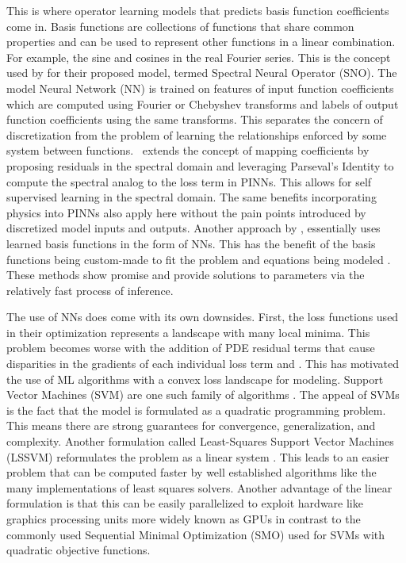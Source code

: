 \documentclass[preprint,12pt,times,authoryear]{elsarticle}
\begin{document}
This is where operator learning models that predicts basis function coefficients come in. Basis functions are collections of functions that share common properties and can be used to represent other functions in a linear combination. For example, the sine and cosines in the real Fourier series. This is the concept used by \citet{fanaskovSpectralNeuralOperators2023} for their proposed model, termed Spectral Neural Operator (SNO). The model Neural Network (NN) is trained on features of input function coefficients which are computed using Fourier or Chebyshev transforms and labels of output function coefficients using the same transforms. This separates the concern of discretization from the problem of learning the relationships enforced by some system between functions.\ \citet{du2024neural} extends the concept of mapping coefficients by proposing residuals in the spectral domain and leveraging Parseval's Identity to compute the spectral analog to the loss term in PINNs. This allows for self supervised learning in the spectral domain. The same benefits incorporating physics into PINNs also apply here without the pain points introduced by discretized model inputs and outputs. Another approach by \citet{luLearningNonlinearOperators2021}, essentially uses learned basis functions in the form of NNs. This has the benefit of the basis functions being custom-made to fit the problem and equations being modeled \citep{meurisMachinelearningbasedSpectralMethods2023}. These methods show promise and provide solutions to parameters via the relatively fast process of inference.

The use of NNs does come with its own downsides. First, the loss functions used in their optimization represents a landscape with many local minima. This problem becomes worse with the addition of PDE residual terms that cause disparities in the gradients of each individual loss term and \citep{rathoreChallengesTrainingPINNs2024,NEURIPS2021_df438e52,basirCriticalInvestigationFailure2022}. This has motivated the use of ML algorithms with a convex loss landscape for modeling. Support Vector Machines (SVM) are one such family of algorithms \citep{vapnikNatureStatisticalLearning2000}. The appeal of SVMs is the fact that the model is formulated as a quadratic programming problem. This means there are strong guarantees for convergence, generalization, and complexity. Another formulation called Least-Squares Support Vector Machines (LSSVM) reformulates the problem as a linear system \citep{suykensLeastSquaresSupport2005}. This leads to an easier problem that can be computed faster by well established algorithms like the many implementations of least squares solvers. Another advantage of the linear formulation is that this can be easily parallelized to exploit hardware like graphics processing units more widely known as GPUs in contrast to the commonly used Sequential Minimal Optimization (SMO) used for SVMs with quadratic objective functions.
\end{document}
